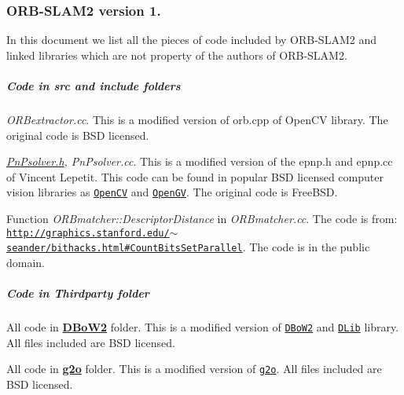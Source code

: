 \subsubsection*{O\+R\+B-\/\+S\+L\+A\+M2 version 1.}

In this document we list all the pieces of code included by O\+R\+B-\/\+S\+L\+A\+M2 and linked libraries which are not property of the authors of O\+R\+B-\/\+S\+L\+A\+M2.

\subparagraph*{Code in {\bfseries src} and {\bfseries include} folders}


\begin{DoxyItemize}
\item {\itshape O\+R\+Bextractor.\+cc}. This is a modified version of orb.\+cpp of Open\+CV library. The original code is B\+SD licensed.
\item {\itshape \mbox{\hyperlink{_pn_psolver_8h}{Pn\+Psolver.\+h}}, Pn\+Psolver.\+cc}. This is a modified version of the epnp.\+h and epnp.\+cc of Vincent Lepetit. This code can be found in popular B\+SD licensed computer vision libraries as \href{https://github.com/Itseez/opencv/blob/master/modules/calib3d/src/epnp.cpp}{\tt Open\+CV} and \href{https://github.com/laurentkneip/opengv/blob/master/src/absolute_pose/modules/Epnp.cpp}{\tt Open\+GV}. The original code is Free\+B\+SD.
\item Function {\itshape O\+R\+Bmatcher\+::\+Descriptor\+Distance} in {\itshape O\+R\+Bmatcher.\+cc}. The code is from\+: \href{http://graphics.stanford.edu/~seander/bithacks.html#CountBitsSetParallel}{\tt http\+://graphics.\+stanford.\+edu/$\sim$seander/bithacks.\+html\#\+Count\+Bits\+Set\+Parallel}. The code is in the public domain.
\end{DoxyItemize}

\subparagraph*{Code in Thirdparty folder}


\begin{DoxyItemize}
\item All code in {\bfseries \mbox{\hyperlink{namespace_d_bo_w2}{D\+Bo\+W2}}} folder. This is a modified version of \href{https://github.com/dorian3d/DBoW2}{\tt D\+Bo\+W2} and \href{https://github.com/dorian3d/DLib}{\tt D\+Lib} library. All files included are B\+SD licensed.
\item All code in {\bfseries \mbox{\hyperlink{namespaceg2o}{g2o}}} folder. This is a modified version of \href{https://github.com/RainerKuemmerle/g2o}{\tt g2o}. All files included are B\+SD licensed.
\end{DoxyItemize}

